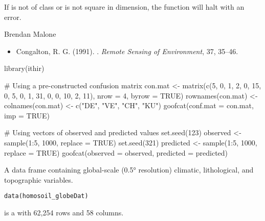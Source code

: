 \documentclass[a4paper]{book}
\begin{document}
%
\begin{Note}
If  is not of class  or is not square in dimension, the function will halt with an error.
\end{Note}
%
\begin{Author}
Brendan Malone
\end{Author}
%
\begin{References}
\begin{itemize}

\item{} Congalton, R. G. (1991). . \emph{Remote Sensing of Environment}, 37, 35–46.

\end{itemize}

\end{References}
%
\begin{Examples}
\begin{ExampleCode}
library(ithir)

# Using a pre-constructed confusion matrix
con.mat <- matrix(c(5, 0, 1, 2,
                    0, 15, 0, 5,
                    0, 1, 31, 0,
                    0, 10, 2, 11), nrow = 4, byrow = TRUE)
rownames(con.mat) <- colnames(con.mat) <- c("DE", "VE", "CH", "KU")
goofcat(conf.mat = con.mat, imp = TRUE)

# Using vectors of observed and predicted values
set.seed(123)
observed <- sample(1:5, 1000, replace = TRUE)
set.seed(321)
predicted <- sample(1:5, 1000, replace = TRUE)
goofcat(observed = observed, predicted = predicted)
\end{ExampleCode}
\end{Examples}
%
\begin{Description}
A data frame containing global-scale (0.5° resolution) climatic, lithological, and topographic variables.
\end{Description}
%
\begin{Usage}
\begin{verbatim}
data(homosoil_globeDat)
\end{verbatim}
\end{Usage}
%
\begin{Format}
 is a  with 62,254 rows and 58 columns.
\end{Format}
\end{document}
